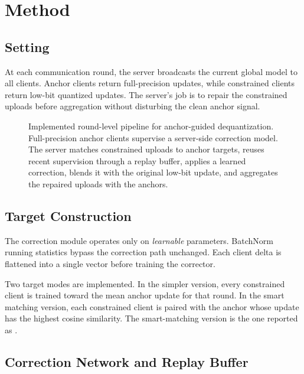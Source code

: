 \section{Method}

\subsection{Setting}

At each communication round, the server broadcasts the current global model to
all clients. Anchor clients return full-precision updates, while constrained
clients return low-bit quantized updates. The server's job is to repair the
constrained uploads before aggregation without disturbing the clean anchor
signal.

\begin{figure}[t]
  \centering
  {\def\methoddiagramfont{\normalsize}%
  \resizebox{0.99\textwidth}{!}{}}
  \caption{Implemented round-level pipeline for anchor-guided dequantization.
  Full-precision anchor clients supervise a server-side correction model. The
  server matches constrained uploads to anchor targets, reuses recent
  supervision through a replay buffer, applies a learned correction, blends it
  with the original low-bit update, and aggregates the repaired uploads with
  the anchors.}
  \label{fig:method_architecture}
\end{figure}

\subsection{Target Construction}

The correction module operates only on \emph{learnable} parameters. BatchNorm
running statistics bypass the correction path unchanged. Each client delta is
flattened into a single vector before training the corrector.

Two target modes are implemented. In the simpler version, every constrained
client is trained toward the mean anchor update for that round. In the smart
matching version, each constrained client is paired with the anchor whose update
has the highest cosine similarity. The smart-matching version is the one
reported as \method.

\subsection{Correction Network and Replay Buffer}

